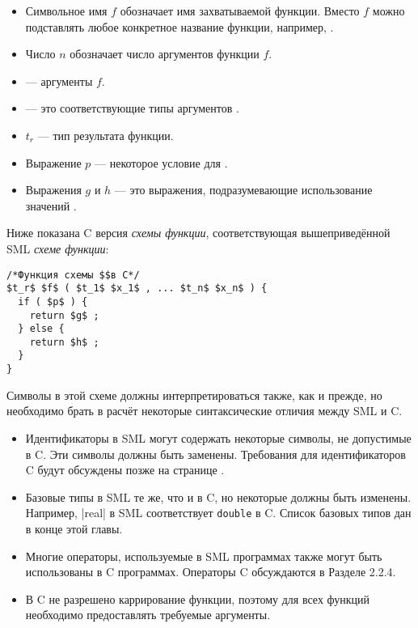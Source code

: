 \begin{itemize}
\item{Символьное имя $f$ обозначает имя захватываемой функции. Вместо $f$ можно подставлять любое конкретное название функции, например, .}

\item{Число $n$ обозначает число аргументов функции $f$.}

\item{ --- аргументы $f$.}

\item{ --- это соответствующие типы аргументов .}

\item{$t_r$ --- тип результата функции.}

\item{Выражение $p$ --- некоторое условие для .}

\item{Выражения $g$ и $h$ --- это выражения, подразумевающие использование значений .}
\end{itemize}

Ниже показана C версия \emph{схемы функции}, соответствующая вышеприведённой SML \emph{схеме функции}:

\begin{lstlisting}
/*Функция схемы $$в C*/
$t_r$ $f$ ( $t_1$ $x_1$ , ... $t_n$ $x_n$ ) {
  if ( $p$ ) {
    return $g$ ;
  } else {
    return $h$ ;
  }
}
\end{lstlisting}

Символы в этой схеме должны интерпретироваться также, как и прежде, но необходимо брать в расчёт некоторые синтаксические отличия между SML и C.

\begin{itemize}
\item{Идентификаторы в SML могут содержать некоторые символы, не допустимые в C. Эти символы должны быть заменены. Требования для идентификаторов C будут обсуждены позже на странице \pageref{CIdentifiers}.}

\item{Базовые типы в SML те же, что и в C, но некоторые должны быть изменены. Например, \inline|real| в SML соответствует \lstinline|double| в C. Список базовых типов дан в конце этой главы.}

\item{Многие операторы, используемые в SML программах также могут быть использованы в C программах. Операторы C обсуждаются в Разделе 2.2.4.}

\item{В C не разрешено каррирование функции, поэтому для всех функций необходимо предоставлять требуемые аргументы.}
\end{itemize}

